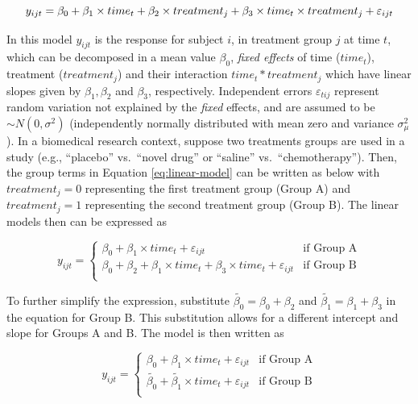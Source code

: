 \documentclass[
]{article}
\begin{document}
\begin{equation}
y_{ijt} = \beta_0+\beta_1 \times time_{t} +\beta_2 \times treatment_{j} +\beta_3 \times time_{t}\times treatment_{j}+\varepsilon_{ijt}\\ 
\label{eq:linear-model}
\end{equation}

In this model \(y_{ijt}\) is the response for subject \(i\), in treatment group \(j\) at time \(t\), which can be decomposed in a mean value \(\beta_0\), \emph{fixed effects} of time (\(time_t\)), treatment (\(treatment_j\)) and their interaction \(time_t*treatment_j\) which have linear slopes given by \(\beta_1, \beta_2\) and \(\beta_3\), respectively. Independent errors \(\varepsilon_{tij}\) represent random variation not explained by the \emph{fixed} effects, and are assumed to be \(\sim N(0,\sigma^2)\) (independently normally distributed with mean zero and variance \(\sigma^2_\mu\)).
In a biomedical research context, suppose two treatments groups are used in a study (e.g., ``placebo'' vs.~``novel drug'' or ``saline'' vs.~``chemotherapy''). Then, the group terms in Equation \eqref{eq:linear-model} can be written as below with \(treatment_j=0\) representing the first treatment group (Group A) and \(treatment_j=1\) representing the second treatment group (Group B). The linear models then can be expressed as

\begin{equation}
y_{ijt} = \begin{cases}
\beta_0 + \beta_1\times time_{t}+\varepsilon_{ijt}   & \mbox{if Group A}\\
\beta_0 + \beta_2+\beta_1 \times time_{t} +\beta_3 \times time_{t}+\varepsilon_{ijt}  & \mbox{if Group B}\\
\end{cases}
\label{eq:ANOVA-by-group}
\end{equation}

To further simplify the expression, substitute \(\widetilde{\beta_{0}}=\beta_0+\beta_{2}\) and \(\widetilde{\beta_{1}}=\beta_{1}+\beta_{3}\) in the equation for Group B. This substitution allows for a different intercept and slope for Groups A and B. The model is then written as

\begin{equation}
y_{ijt} = \begin{cases}
\beta_0 + \beta_1\times time_{t}+\varepsilon_{ijt}   & \mbox{if Group A}\\
\widetilde{\beta_{0}} + \widetilde{\beta_1} \times time_{t}+\varepsilon_{ijt}  & \mbox{if Group B}\\
\end{cases}
\label{eq:ANOVA-lines}
\end{equation}
\end{document}
